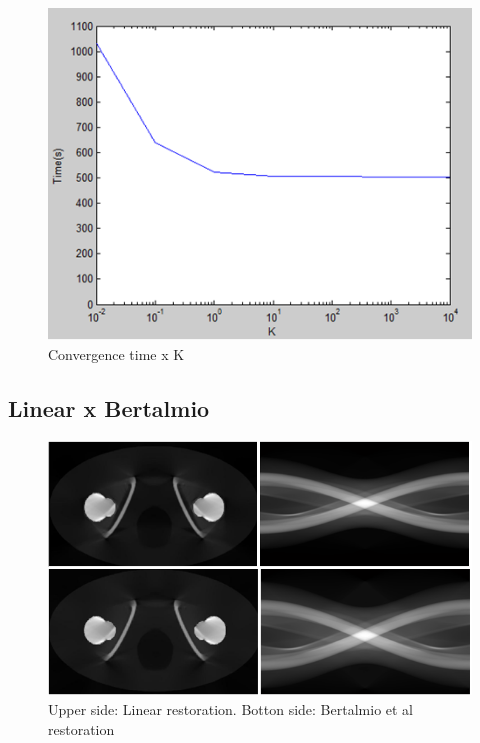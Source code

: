 \begin{figure}[H]
\centering
\includegraphics[scale=0.66]{img/k_time}
\caption{{Convergence time x K}}\label{k_time}
\end{figure}

\subsection{Linear x Bertalmio}

\begin{figure}[H]
\centering
\includegraphics[scale=0.7]{img/linear_bertalmio}
\caption{{Upper side: Linear restoration. Botton side: Bertalmio et al restoration }}\label{linear_bertalmio}
\end{figure}

